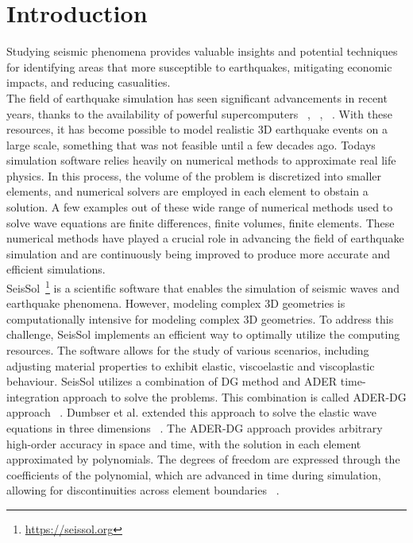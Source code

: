 
\chapter{Introduction}\label{chapter:introduction}

Studying seismic phenomena provides valuable insights and potential techniques for identifying areas that more susceptible to earthquakes, mitigating economic impacts, 
and reducing casualities. \\

The field of earthquake simulation has seen significant advancements in recent years, thanks to the availability of powerful supercomputers ~\parencite{inproceedings}, ~\parencite{breuer}, ~\parencite{seissol}.
With these resources, it has become possible to model realistic 3D earthquake events on a large scale, something that was not feasible until a few decades ago. 
Todays simulation software relies heavily on numerical methods to approximate real life physics. In this process, the volume of the problem is discretized into smaller elements, and numerical solvers are employed in each element to obstain a solution.
A few examples out of these wide range of numerical methods used to solve wave equations are finite differences, finite volumes, finite elements. These numerical methods have played a crucial role in advancing the field of earthquake simulation and are continuously being improved to produce more accurate and efficient simulations. \\

SeisSol~\footnote{\href{https://seissol.org}{https://seissol.org}} is a scientific software that enables the simulation of seismic waves and earthquake phenomena. 
However, modeling complex 3D geometries is computationally intensive for modeling complex 3D geometries.
To address this challenge, SeisSol implements an efficient way to optimally utilize the computing resources. 
The software allows for the study of various scenarios, including adjusting material properties to exhibit elastic, viscoelastic and viscoplastic behaviour.
SeisSol utilizes a combination of \ac{DG} method and \ac{ADER} time-integration approach to solve the problems.
This combination is called \ac{ADER}-\ac{DG} approach ~\parencite{dumbser}. Dumbser et al. extended this approach to solve the elastic wave equations in three dimensions ~\parencite{dumbser1}. The \ac{ADER}-\ac{DG} approach provides arbitrary high-order accuracy in space and time, with the solution in each element approximated by polynomials.
The degrees of freedom are expressed through the coefficients of the polynomial, which are advanced in time during simulation, allowing for discontinuities across element boundaries ~\parencite{martin}. \\

